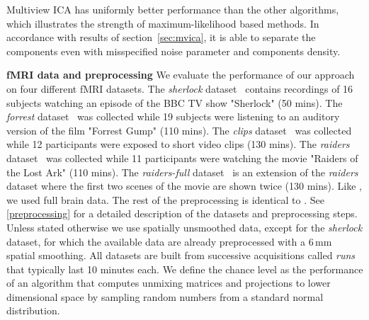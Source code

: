 \documentclass{report}
\begin{document}
{Multiview ICA has uniformly better performance than the other algorithms, which illustrates the strength of maximum-likelihood based methods. In accordance with results of section~\ref{sec:mvica}, it is able to separate the components even with misspecified noise parameter and components density.
%

\textbf{fMRI data and preprocessing} 
We evaluate the performance of our approach on four different fMRI datasets.
%
The \emph{sherlock} dataset~\cite{chen2017shared} contains recordings of 16 subjects watching an episode of the BBC TV show "Sherlock" (50 mins).
%
The \emph{forrest} dataset~\cite{hanke2014high} was collected while 19 subjects were listening to an auditory version of the film "Forrest Gump" (110 mins).
%
The \emph{clips} dataset~\cite{ibc} was collected while 12 participants were exposed to short video clips (130 mins).
%
The \emph{raiders} dataset~\cite{ibc} was collected while 11 participants were watching the movie "Raiders of the Lost Ark" (110 mins).
%
The \emph{raiders-full} dataset~\cite{ibc} is an extension of the \emph{raiders} dataset where the first two scenes of the movie are shown twice (130 mins).
%
Like \cite{zhang2016searchlight}, we used full brain data. The rest of the preprocessing is identical to \cite{chen2017shared}. See \ref{preprocessing} for a detailed description of the datasets and preprocessing steps. Unless stated otherwise we use spatially unsmoothed data, except for the \emph{sherlock} dataset, for which the available data are already preprocessed with a 6\,mm spatial smoothing. All datasets are built from successive acquisitions called \emph{runs} that typically last 10 minutes each.
%
We define the chance level as the performance of an algorithm that computes unmixing matrices and projections to lower dimensional space by sampling random numbers from a standard normal distribution. 
%

}
\end{document}
